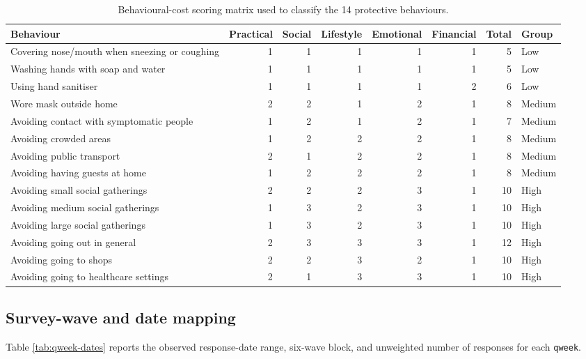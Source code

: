 \documentclass[
  12pt,
  a4paper,
]{article}
\begin{document}
\begin{landscape}

\begin{table}

\caption{\label{tab:cost-scoring}Behavioural-cost scoring matrix used to classify the 14 protective behaviours.}
\centering
\begin{tabular}[t]{lrrrrrrl}
\toprule
Behaviour & Practical & Social & Lifestyle & Emotional & Financial & Total & Group\\
\midrule
Covering nose/mouth when sneezing or coughing & 1 & 1 & 1 & 1 & 1 & 5 & Low\\
Washing hands with soap and water & 1 & 1 & 1 & 1 & 1 & 5 & Low\\
Using hand sanitiser & 1 & 1 & 1 & 1 & 2 & 6 & Low\\
Wore mask outside home & 2 & 2 & 1 & 2 & 1 & 8 & Medium\\
Avoiding contact with symptomatic people & 1 & 2 & 1 & 2 & 1 & 7 & Medium\\
\addlinespace
Avoiding crowded areas & 1 & 2 & 2 & 2 & 1 & 8 & Medium\\
Avoiding public transport & 2 & 1 & 2 & 2 & 1 & 8 & Medium\\
Avoiding having guests at home & 1 & 2 & 2 & 2 & 1 & 8 & Medium\\
Avoiding small social gatherings & 2 & 2 & 2 & 3 & 1 & 10 & High\\
Avoiding medium social gatherings & 1 & 3 & 2 & 3 & 1 & 10 & High\\
\addlinespace
Avoiding large social gatherings & 1 & 3 & 2 & 3 & 1 & 10 & High\\
Avoiding going out in general & 2 & 3 & 3 & 3 & 1 & 12 & High\\
Avoiding going to shops & 2 & 2 & 3 & 2 & 1 & 10 & High\\
Avoiding going to healthcare settings & 2 & 1 & 3 & 3 & 1 & 10 & High\\
\bottomrule
\end{tabular}
\end{table}

\end{landscape}

\subsection{Survey-wave and date mapping}\label{survey-wave-and-date-mapping}

Table \ref{tab:qweek-dates} reports the observed response-date range,
six-wave block, and unweighted number of responses for each \texttt{qweek}.
\end{document}
